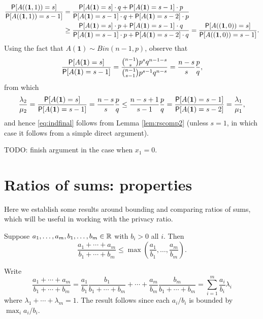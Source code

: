 \documentclass[11pt,draft]{article}
\newcommand{\one}{\boldsymbol{1}}
\begin{document}
\begin{pf}
\begin{align}
\frac{\P[A((\one,1)) = s]}{\P[A((\one,1)) = s-1]} &=
\frac{\P[A(\one) = s]\cdot q +
\P[A(\one) = s-1]\cdot p}
{\P[A(\one) = s-1]\cdot q +
\P[A(\one) = s-2]\cdot p} \nonumber\\
&\geq
\frac{\P[A(\one) = s]\cdot p +
\P[A(\one) = s-1]\cdot q}
{\P[A(\one) = s-1]\cdot p +
\P[A(\one) = s-2]\cdot q}
= \frac{\P[A((\one,0)) = s]}{\P[A((\one,0)) = s-1]}.
\label{eq:indfinal}
\end{align}
Using the fact that $A(\one) \sim Bin(n-1, p)$, observe that
\[
\frac{\P[A(\one) = s]}{\P[A(\one) = s-1]}
= \frac{\binom{n-1}{s}p^{s}q^{n-1-s}}{\binom{n-1}{s-1}p^{s-1}q^{n-s}}
= \frac{n-s}{s}\frac{p}{q},
\]
from which
\[
\frac{\lambda_2}{\mu_2} = \frac{\P[A(\one) = s]}{\P[A(\one) = s-1]}
= \frac{n-s}{s}\frac{p}{q} \leq \frac{n-s+1}{s-1}\frac{p}{q}
= \frac{\P[A(\one) = s-1]}{\P[A(\one) = s-2]} = \frac{\lambda_1}{\mu_1},
\]
and hence \eqref{eq:indfinal} follows from Lemma \ref{lem:rscomp2} (unless $s=1$, in which case it follows from a simple direct argument).
\end{pf}
TODO: finish argument in the case when $x_1 = 0$.    

\section{Ratios of sums: properties}

Here we establish some results around bounding and comparing ratios of sums, which will be useful in working with the privacy ratio.


\begin{lem} \label{lem:rsbound}
Suppose $a_1,\dots,a_m,b_1,\dots,b_m \in \mathbb{R}$ with $b_i > 0$ all $i$.
Then 
\[ \frac{a_1 + \cdots + a_m}{b_1 + \cdots + b_m} \leq
\max\left(\frac{a_1}{b_1},\dots,\frac{a_m}{b_m}\right). \]
\end{lem}
\begin{pf}
Write
\[ \frac{a_1 + \cdots + a_m}{b_1 + \cdots + b_m}
= \frac{a_1}{b_1}\frac{b_1}{b_1+\cdots+b_m} +
\cdots + \frac{a_m}{b_m}\frac{b_m}{b_1+\cdots+b_m} =
\sum_{i=1}^m \frac{a_i}{b_i} \lambda_i
\]
where $\lambda_1 + \cdots + \lambda_m = 1$.
The result follows since each $a_i/b_i$ is bounded by $\max_i a_i/b_i$.
\end{pf}

\end{document}
